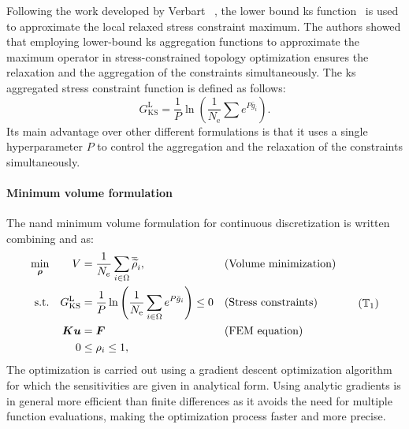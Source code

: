 Following the work developed by Verbart \etal~, the lower bound \gls{ks} function~ is used to approximate the local relaxed stress constraint maximum. The authors showed that employing lower-bound \gls{ks} aggregation functions to approximate the maximum operator in stress-constrained topology optimization ensures the relaxation and the aggregation of the constraints simultaneously. The \gls{ks} aggregated stress constraint function is defined as follows:
\begin{equation} 
    G_{\text{KS}}^\text{L} = \frac{1}{P} \ln{\left( \frac{1}{N_\text{e}} \sum e^{{P}\bar{g}_i} \right)}.
    \label{eq:03_gksl}
\end{equation}
Its main advantage over other different formulations is that it uses a single hyperparameter $P$ to control the aggregation and the relaxation of the constraints simultaneously.

\paragraph{Minimum volume formulation}
The \gls{nand} minimum volume formulation for continuous discretization is written combining  and  as:
\begin{equation}
    \begin{aligned}
    \min_{\bm{\rho}}         && V &= \frac{1}{N_{e}} \sum_{i \in \Omega} \rhophys_i, && \text{(Volume minimization)} \\
    \textrm{s.t.}   && G_{\text{KS}}^\text{L} &= \frac{1}{P} \ln{\left( \frac{1}{N_\text{e}} \sum_{i \in \Omega} e^{{P}\bar{g}_i} \right)} \leq 0 && \textrm{(Stress constraints)}\\
    && \bm{K}\bm{u} &= \bm{F} && \textrm{(FEM equation)}\\
    && 0 &\leq \rho_i \leq 1, \\
    \end{aligned}
    \tag{$\mathbb{T}_1$}
    \label{eq:03_prob-stress}
\end{equation}
The optimization is carried out using a gradient descent optimization algorithm for which the sensitivities are given in analytical form. Using analytic gradients is in general more efficient than finite differences as it avoids the need for multiple function evaluations, making the optimization process faster and more precise.

